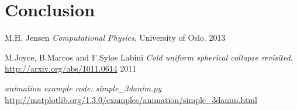 \documentclass{article}
\begin{document}


\newpage
\section{Conclusion}




\newpage
\begin{thebibliography}{9}

  M.H. Jensen
  \emph{Computational Physics}.
  University of Oslo.
  2013

  M.Joyce, B.Marcos and F.Sylos Labini
  \emph{Cold uniform spherical collapse revisited}.
  \url{http://arxiv.org/abs/1011.0614}
  2011

\emph{animation example code: simple\_3danim.py}
\url{http://matplotlib.org/1.3.0/examples/animation/simple_3danim.html}

\end{thebibliography}

\end{document}
